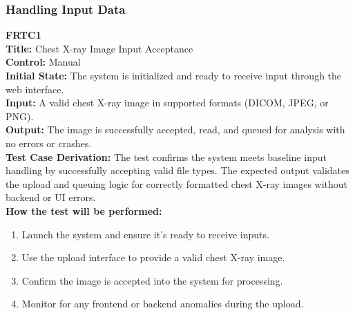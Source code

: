 \documentclass[12pt, titlepage]{article}
\begin{document}
\subsubsection{Handling Input Data}

\textbf{FRTC1}\\
\textbf{Title:} Chest X-ray Image Input Acceptance\\
\textbf{Control:} Manual\\
\textbf{Initial State:} The system is initialized and ready to receive input through the web interface.\\
\textbf{Input:} A valid chest X-ray image in supported formats (DICOM, JPEG, or PNG).\\
\textbf{Output:} The image is successfully accepted, read, and queued for analysis with no errors or crashes.\\
\textbf{Test Case Derivation:} The test confirms the system meets baseline input handling by successfully accepting valid file types. The expected output validates the upload and queuing logic for correctly formatted chest X-ray images without backend or UI errors.\\
\textbf{How the test will be performed:}
\begin{enumerate}
  \item Launch the system and ensure it's ready to receive inputs.
  \item Use the upload interface to provide a valid chest X-ray image.
  \item Confirm the image is accepted into the system for processing.
  \item Monitor for any frontend or backend anomalies during the upload.
\end{enumerate}

\vspace{1em}
\end{document}

